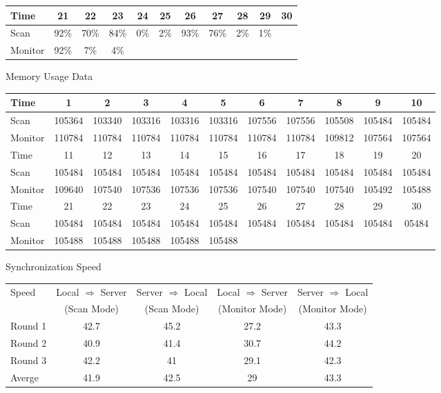 \begin{center}
\begin{tabular}{ | l || c | c | c | c | c | c | c | c | c | c | }
Time	& 21 & 22	 & 23	& 24	& 25	& 26 	& 27 	& 28 	& 29 	& 30 		\\ \hline\hline
Scan	& 92\% & 70\%& 84\%	& 0\% 	& 2\% 	& 93\%	& 76\%	& 2\%	& 1\%	&   		\\ \hline
Monitor	& 92\% & 7\% & 4\%	& 		& 	 	& 		& 		&	  	& 		&   		\\ \hline\hline
  \end{tabular}

\vspace{0.05in}
Memory Usage Data

\begin{tabular}{ | l || c | c | c | c | c | c | c | c | c | c | }
    \hline
Time	& 1  & 2	 & 3 	& 4 	& 5 	& 6 	& 7 	& 8 	& 9 	& 10	 	\\ \hline\hline
Scan	& 105364 & 103340 & 103316 & 103316	& 103316 & 107556 & 107556 & 105508 & 105484 & 105484 \\ \hline
Monitor	& 110784 & 110784 & 110784 & 110784	& 110784 & 110784 & 110784 & 109812 & 107564 & 107564 \\ \hline\hline

Time 	& 11 & 12	 & 13	& 14	& 15	& 16 	& 17 	& 18 	& 19 	& 20 		\\ \hline\hline
Scan	& 105484 & 105484 & 105484 & 105484	& 105484 & 105484 & 105484 & 105484 & 105484 & 105484 \\ \hline
Monitor	& 109640 & 107540 & 107536 & 107536	& 107536 & 107540 & 107540 & 107540 & 105492 & 105488 \\ \hline\hline

Time	& 21 & 22	 & 23	& 24	& 25	& 26 	& 27 	& 28 	& 29 	& 30 		\\ \hline\hline
Scan	& 105484 & 105484 & 105484 & 105484	& 105484 & 105484 & 105484 & 105484 & 105484 & 05484 \\ \hline
Monitor	& 105488 & 105488 & 105488 & 105488	& 105488 &  &  &  &  & \\ \hline\hline
  \end{tabular}

\vspace{0.05in}
Synchronization Speed
\begin{tabular}{ | l || c | c | c | c | }
    \hline
Speed	&	Local $\Rightarrow$ Server &	Server $\Rightarrow$ Local &	Local $\Rightarrow$ Server & Server $\Rightarrow$ Local\\
     	& (Scan Mode) &	(Scan Mode) &	(Monitor Mode)	& (Monitor Mode)\\
\hline\hline
Round 1	& 42.7 & 45.2 & 27.2 & 43.3 \\ \hline
Round 2	& 40.9 & 41.4 & 30.7 & 44.2 \\ \hline
Round 3	& 42.2 & 41	& 29.1 & 42.3	\\ \hline
Averge 	& 41.9 & 42.5 &	29 & 43.3 \\ 
	\hline
  \end{tabular}
\end{center}